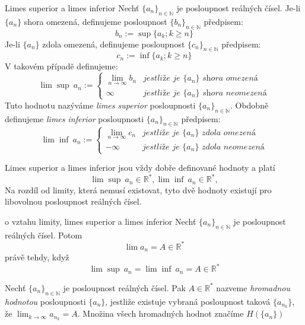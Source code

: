 \begin{definiceN}{Limes superior a limes inferior}
Nechť $\{a_n\}_{n \in \mathbb{N}}$ je posloupnost reálných čísel. Je-li $\{a_n\}$ shora omezená, definujeme posloupnost $\{b_n\}_{n \in \mathbb{N}}$ předpisem:
$$
	b_n := \sup\{a_k; k \ge n \}
$$
Je-li $\{a_n\}$ zdola omezená, definujeme posloupnost $\{c_n\}_{n \in \mathbb{N}}$ předpisem:
$$
	c_n := \inf\{a_k; k \ge n \}
$$
V takovém případě definujeme:
$$
\lim \sup~a_n := \left\{
\begin{array}{ll} \lim_{n \rightarrow \infty} b_n & \textit{jestliže je } \{a_n\} \textit{ shora omezená} \\ \infty & \textit{jestliže je } \{a_n\} \textit{ shora neomezená} \end{array}
\right.
$$
Tuto hodnotu nazýváme \emph{limes superior} posloupnosti $\{a_n\}_{n \in \mathbb{N}}$. Obdobně definujeme \emph{limes inferior} posloupnosti $\{a_n\}_{n \in \mathbb{N}}$ předpisem:
$$
\lim \inf~a_n := \left\{
\begin{array}{ll} \lim_{n \rightarrow \infty} c_n & \textit{jestliže je } \{a_n\} \textit{ zdola omezená} \\ - \infty & \textit{jestliže je } \{a_n\} \textit{ zdola neomezená} \end{array}
\right.
$$
\end{definiceN}

\begin{poznamka}
Limes superior a limes inferior jsou vždy dobře definované hodnoty a platí
$$
\lim \sup~a_n \in \mathbb{R}^*, \lim \inf~a_n \in \mathbb{R}^*, 
$$
Na rozdíl od limity, která nemusí existovat, tyto dvě hodnoty existují pro
libovolnou posloupnost reálných čísel.
\end{poznamka}

\begin{vetaN}{o vztahu limity, limes superior a limes inferior}
Nechť $\{a_n\}_{n \in \mathbb{N}}$ je posloupnost reálných čísel. Potom 
$$
	\lim a_n = A \in \mathbb{R}^{*}
$$
právě tehdy, když
$$
\lim \sup~a_n = \lim \inf~a_n = A \in \mathbb{R}^*
$$
\end{vetaN}

\begin{definice}
Nechť $\{a_n\}_{n \in \mathbb{N}}$ je posloupnost reálných čísel. Pak $A \in \mathbb{R}^*$ nazveme \emph{hromadnou hodnotou} posloupnosti $\{a_n\}$, jestliže existuje vybraná posloupnost taková $\{a_{n_k}\}$, že $\lim_{k \rightarrow \infty} a_{n_k} = A$. Množina všech hromadných hodnot značíme $H(\{a_n\})$
\end{definice}

